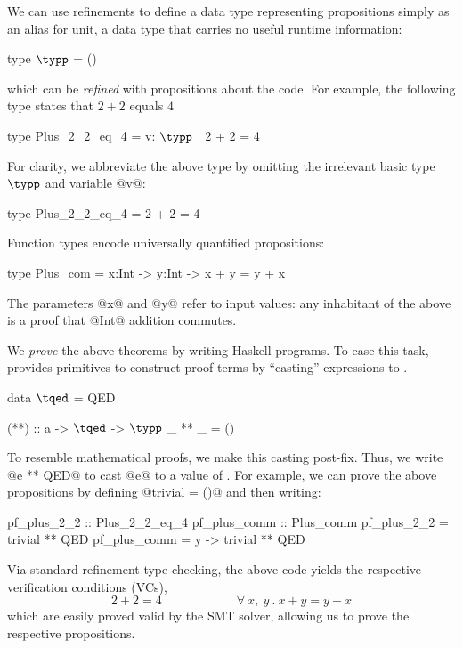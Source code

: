 %
We can use refinements to define a data type
representing propositions simply as an alias
for unit, a data type that carries no useful
runtime information:
%
\begin{mcode}
    type $\typp$ = ()
\end{mcode}
%
which can be \emph{refined} with
propositions about the code.
For example, the following type states that
$2 + 2$ equals $4$
%
\begin{mcode}
    type Plus_2_2_eq_4 = { v: $\typp$ | 2 + 2 = 4 }
\end{mcode}
%
For clarity, we abbreviate the above type by omitting
the irrelevant basic type $\typp$ and variable @v@:
%
\begin{mcode}
    type Plus_2_2_eq_4 = { 2 + 2 = 4 }
\end{mcode}
%
Function types encode universally quantified propositions:
%
\begin{mcode}
    type Plus_com = x:Int -> y:Int -> { x + y = y + x }
\end{mcode}
%
The parameters @x@ and @y@ refer to input
values: any inhabitant of the above is a
proof that @Int@ addition commutes.

%
We \emph{prove} the above theorems by
writing Haskell programs. To ease this task, \toolname
provides primitives to construct proof terms by
``casting'' expressions to \typp.
%
\begin{mcode}
    data $\tqed$ = QED

    (**) :: a -> $\tqed$ -> $\typp$
    _ ** _  = ()
\end{mcode}
%
To resemble mathematical proofs, we make this casting post-fix.
Thus, we write @e ** QED@ to cast @e@ to a value of \typp.
%
For example, we can prove the above propositions by defining
@trivial = ()@ and then writing:
%
\begin{code}
    pf_plus_2_2 :: Plus_2_2_eq_4          pf_plus_comm :: Plus_comm
    pf_plus_2_2 = trivial ** QED          pf_plus_comm = \x y -> trivial ** QED
\end{code}
%
Via standard refinement type checking, the above code yields
the respective verification conditions (VCs),
%
$$ 2 + 2 = 4 \quad \quad \quad \quad \quad \quad \forall \ x,\ y\ .\ x + y = y + x $$
%
%
which are easily proved valid by the SMT solver, allowing us
to prove the respective propositions.

